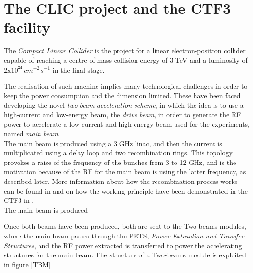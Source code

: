 \section{The CLIC project and the CTF3 facility}

The \textit{Compact Linear Collider} is the project for a linear electron-positron collider capable of reaching a centre-of-mass collision energy of 3 TeV and a luminosity of $2\text{x}10^{34} \, cm^{-2} \, s^{-1}$ in the final stage.

The realisation of such machine implies many technological challenges in order to keep the power consumption and the dimension limited. These have been faced developing the novel \textit{two-beam acceleration scheme}, in which the idea is to use a high-current and low-energy beam, the \textit{drive beam}, in order to generate the RF power to accelerate a low-current and high-energy beam used for the experiments, named \textit{main beam}. \\
The main beam is produced using a 3 GHz linac, and then the current is multiplicated using a delay loop and two recombination rings. This topology provokes a raise of the frequency of the bunches from 3 to 12 GHz, and is the motivation because of the RF for the main beam is using the latter frequency, as described later. More information about how the recombination process works can be found in \cite{CLIC:cdr} and on how the working principle have been demonstrated in the CTF3 in \cite{CTF:drive_beam}.\\
The main beam is produced %
\cite{boh}

Once both beams have been produced, both are sent to the Two-beams modules, where the main beam passes through the PETS, \textit{Power Extraction and Transfer Structures}, and the RF power extracted is transferred to power the accelerating structures for the main beam. The structure of a Two-beams module is exploited in figure \ref{TBM}



